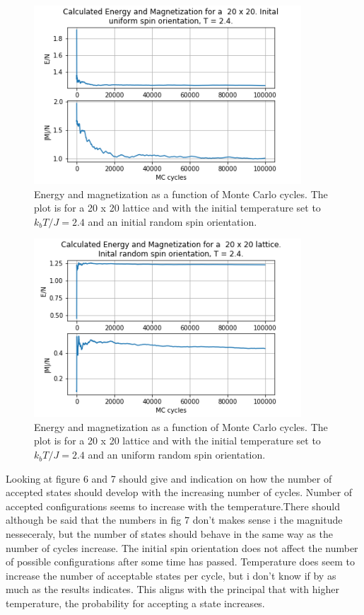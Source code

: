 \documentclass[twoside,twocolumn]{article}
\begin{document}
\begin{figure}[h]
  \includegraphics[width= 10cm]{N=20T=2.4U.png}
  \caption{Energy and magnetization as a function of Monte Carlo cycles. The plot is for a 20 x 20 lattice and with the initial temperature set to $k_bT/J = 2.4$ and an initial random spin orientation.}
  \label{fig:boat4}
\end{figure}

\begin{figure}[h]
  \includegraphics[width= 10cm]{N=20T=2.4R.png}
  \caption{Energy and magnetization as a function of Monte Carlo cycles. The plot is for a 20 x 20 lattice and with the initial temperature set to $k_bT/J = 2.4$ and an uniform random spin orientation.}
  \label{fig:boat5}
\end{figure}

Looking at figure 6 and 7 should give and indication on how the number of accepted states should develop with the increasing number of cycles. Number of accepted configurations seems to increase with the temperature.There should although be said that the numbers in fig 7 don't makes sense i the magnitude nesseceraly, but the number of states should behave in the same way as the number of cycles increase. The initial spin orientation does not affect the number of possible configurations after some time has passed. Temperature does seem to increase the number of acceptable states per cycle, but i don't know if by as much as the results indicates. This aligns with the principal that with higher temperature, the probability for accepting a state increases.
\\
\\
\\
\\
\\
\end{document}
